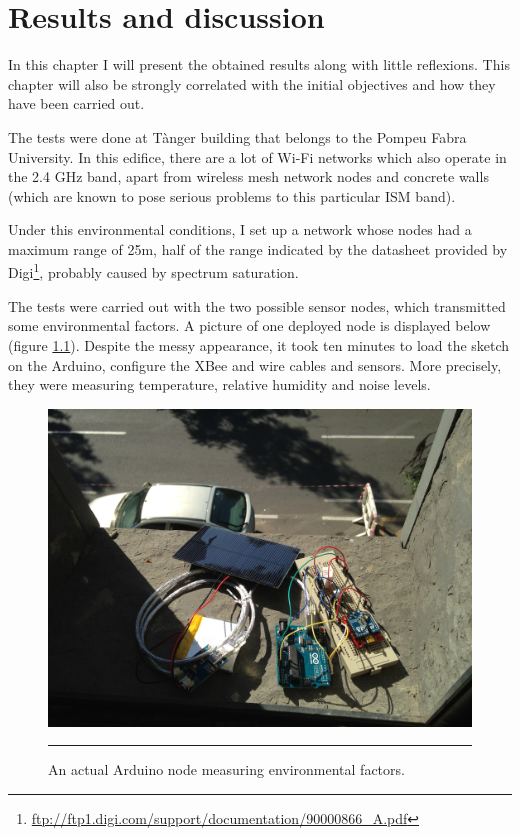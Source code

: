\chapter{Results and discussion}

\label{Chapter6}


In this chapter I will present the obtained results along with little reflexions. This chapter will also be strongly correlated with the initial objectives and how they have been carried out.

The tests were done at T\`{a}nger building that belongs to the Pompeu Fabra University. In this edifice, there are a lot of Wi-Fi networks which also operate in the 2.4 GHz band, apart from wireless mesh network nodes and concrete walls (which are known to pose serious problems to this particular ISM band).

Under this environmental conditions, I set up a network whose nodes had a maximum range of 25m, half of the range indicated by the datasheet provided by Digi\footnote{\url{ftp://ftp1.digi.com/support/documentation/90000866_A.pdf}}, probably caused by spectrum saturation.

The tests were carried out with the two possible sensor nodes, which transmitted some environmental factors. A picture of one deployed node is displayed below (figure \ref{fig:arduinoventana}). Despite the messy appearance, it took ten minutes to load the sketch on the Arduino, configure the XBee\textregistered{} and wire cables and sensors. More precisely, they were measuring temperature, relative humidity and noise levels.

\begin{figure}[htbp]
    \centering
        \includegraphics[scale=0.12,angle=180]{./Figures/arduinoventana.jpg}
        \rule{35em}{0.5pt}
    \caption[Real-life Arduino node]{An actual Arduino node measuring environmental factors.}
    \label{fig:arduinoventana}
\end{figure}

